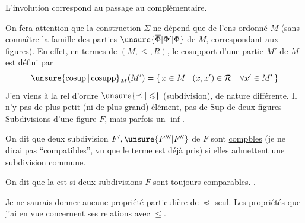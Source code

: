 L'involution correspond au passage au complémentaire.

On fera attention que la construction $\Sigma$ ne dépend que de l'ens ordonné $M$  (sans connaître  la famille des parties $\unsure{\overline\Phi|\Phi'|\Phi}$ de $M$, correspondant aux figures). En effet, en termes de $(M,\leq,R)$, le cosupport d'une partie $M'$ de $M$ est défini par
\[
\unsure{\operatorname{cosup}|\operatorname{cosupp}}_M(M')=\{\,x\in M\mid(x,x')\in\mathcal R\quad\forall x'\in M'\,\}
\]
J'en viens à la rel d'ordre $\unsure{\preceq|\leqslant}$ (subdivision), de nature  différente. Il n'y  pas de plus petit (ni de plus grand) élément, pas de $\mathrm{Sup}$ de deux  figures    Subdivisions d'une  figure $F$, mais parfois un $\inf$.

On dit que deux subdivision $F',\unsure{F'''|F''}$ de $F$ sont \uline{compbles}  (je ne dirai pas ``compatibles'', vu que le terme est déjà pris) si elles admettent une subdivision commune.


On dit que la  est  si deux subdivisions   $F$ sont toujours comparables.  .

 Je ne saurais donner aucune propriété particulière de $\preceq$  seul. Les propriétés que j'ai en vue concernent ses relations avec $\leq$.

